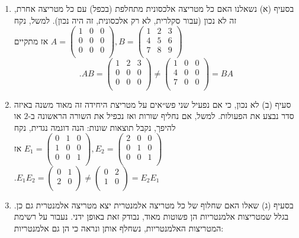 \documentclass[12pt, a4paper]{article}
\begin{document}
\begin{enumerate}
\underline{פתרון:}
\item[$\bullet$]
בסעיף (א) נשאלנו האם כל מטריצה אלכסונית מתחלפת (בכפל) עם כל מטריצה אחרת, זה לא נכון (עבור סקלרית, לא רק אלכסונית, זה היה נכון). למשל, נקח
$A=\begin{pmatrix}
1&0&0\\
0&0&0\\
0&0&0\\
\end{pmatrix}, 
B=\begin{pmatrix}
1&2&3\\
4&5&6\\
7&8&9\\
\end{pmatrix}$
אז מתקיים
$$.AB=\begin{pmatrix}
1&2&3\\
0&0&0\\
0&0&0\\
\end{pmatrix}\neq
\begin{pmatrix}
1&0&0\\
4&0&0\\
7&0&0\\
\end{pmatrix}=BA$$
\item[$\bullet$]
סעיף (ב) לא נכון, כי אם נפעיל שני פש״אים על מטריצת היחידה זה מאוד משנה באיזה סדר נבצע את הפעולות. למשל, אם נחליף שורות ואז נכפיל את השורה הראשונה ב-$2$
או להיפך, נקבל תוצאות שונות: הנה דוגמה נגדית, נקח 
$E_1=\begin{pmatrix}
0&1&0\\
1&0&0\\
0&0&1\\
\end{pmatrix},
E_2=\begin{pmatrix}
2&0&0\\
0&1&0\\
0&0&1\\
\end{pmatrix}$
אז
$.E_1E_2=\begin{pmatrix}
0&1\\2&0\\
\end{pmatrix}\neq
\begin{pmatrix}
0&2\\1&0\\
\end{pmatrix}=
E_2E_1$
\item[$\bullet$]
בסעיף (ג) שאלו האם שחלוף של כל מטריצה אלמנטרית יצא מטריצה אלמנטרית גם כן. בגלל שמטריצות אלמנטריות הן פשוטות מאוד, נבודק זאת באופן ידני. נעבור על רשימת המטריצות האלמנטריות, נשחלף אותן ונראה כי הן גם אלמנטריות:

\end{enumerate}
\end{document}
